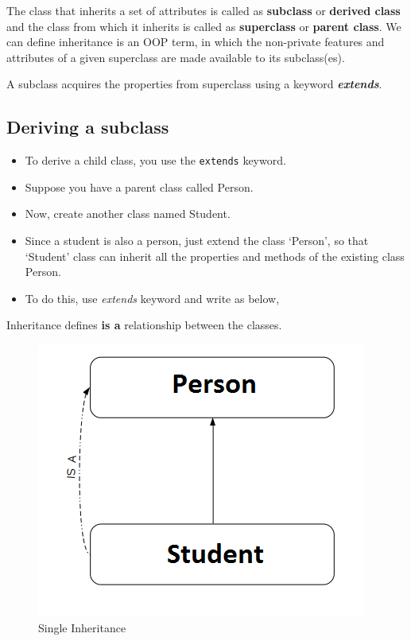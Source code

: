\documentclass[11pt,a4paper]{article}
\begin{document}
 The class that inherits a set of attributes is called as \textbf{subclass} or \textbf{derived class} and the class from which it inherits is called as \textbf{superclass} or \textbf{parent class}. We can define inheritance is an OOP term, in which the non-private features and attributes of a given superclass are made available to its subclass(es).
 
 A subclass acquires the properties from superclass using a keyword \emph{\textbf{extends}}. 
 
 \subsection*{Deriving a subclass}
\begin{itemize}
\item To derive a child class, you use the \lstinline!extends! keyword.
\item Suppose you have a parent class called Person.
 
 
 
  \item Now, create another class named Student.
  \item Since a student is also a person, just extend the class `Person', so that `Student' class can inherit all the properties and methods of the existing class Person.
  \item To do this, use \emph{extends} keyword and write as below,
  
  
\end{itemize}
 
 Inheritance defines \textbf{is a} relationship between the classes.
 
 \begin{figure}[H] 
 \begin{center}
  \includegraphics[scale=.5]{is_a_Relation.png}
   \caption{Single Inheritance}
 \end{center}
 \end{figure}
 
\end{document}
